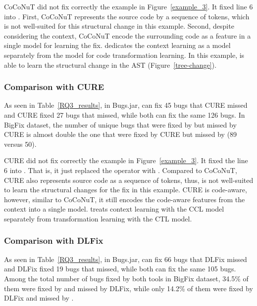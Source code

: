 CoCoNuT did not fix correctly the example in Figure~\ref{example_3}.
It fixed line 6 into   
 . First, CoCoNuT represents the
source code by a sequence of tokens, which is not well-suited for this
structural change in this example. Second, despite considering the
context, CoCoNuT encode the surrounding code as a feature in a single
model for learning the fix. {\tool} dedicates the context learning as
a model separately from the model for code transformation learning.
In this example, {\tool} is able to learn the structural change in the
AST (Figure~\ref{tree-change}).

\subsubsection{\bf Comparison with CURE}

As seen in Table~\ref{RQ3_results}, in Bugs.jar, {\tool} can fix 45
bugs that CURE missed and CURE fixed 27 bugs that {\tool} missed,
while both can fix the same 126 bugs. In BigFix dataset, the number of
unique bugs that were fixed by {\tool} but missed by CURE is almost
double the one that were fixed by CURE but missed by {\tool} (89
versus 50).

CURE did not fix correctly the example in Figure~\ref{example_3}. It
fixed the line 6 into   
  \code{/} .
That is, it just replaced the operator \code{\%} with \code{/}.
Compared to CoCoNuT, CURE also represents source code as a sequence of
tokens, thus, is not well-suited to learn the structural changes for
the fix in this example. CURE is code-aware, however, similar to
CoCoNuT, it still encodes the code-aware features from the context
into a single model. {\tool} treats context learning with the CCL
model separately from transformation learning with the CTL model.

\subsubsection{\bf Comparison with DLFix}

As seen in Table~\ref{RQ3_results}, in Bugs.jar, {\tool} can fix 66
bugs that DLFix missed and DLFix fixed 19 bugs that {\tool}
missed, while both can fix the same 105 bugs. Among the total
number of bugs fixed by both tools in BigFix dataset, 34.5\% of them
were fixed by {\tool} and missed by DLFix, while only 14.2\% of them
were fixed by DLFix and missed by {\tool}.

